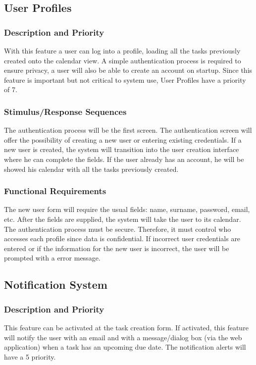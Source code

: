 \documentclass{article}
\begin{document}
\subsection{User Profiles}
\subsubsection{Description and Priority}
With this feature a user can log into a profile, loading all the tasks previously created onto the calendar view. 
A simple authentication process is required to ensure privacy, a user will also be able to create an account on startup. 
Since this feature is important but not critical to system use, User Profiles have a priority of 7.

\subsubsection{Stimulus/Response Sequences}
The authentication process will be the first screen. 
The authentication screen will offer the possibility of creating a new user or entering existing credentials. 
If a new user is created, the system will transition into the user creation interface where he can complete the fields. 
If the user already has an account, he will be showed his calendar with all the tasks previously created. 
\subsubsection{Functional Requirements}
The new user form will require the usual fields: name, surname, password, email, etc. 
After the fields are supplied, the system will take the user to its calendar. 
The authentication process must be secure. Therefore, it must control who accesses each profile since data is confidential. 
If incorrect user credentials are entered or if the information for the new user is incorrect, the user will be prompted with a error message.

\subsection{Notification System}
\subsubsection{Description and Priority}
This feature can be activated at the task creation form. 
If activated, this feature will notify the user with an email and with a message/dialog box (via the web application) when a task has an upcoming due date. The notification alerts will have a 5 priority.
\end{document}
